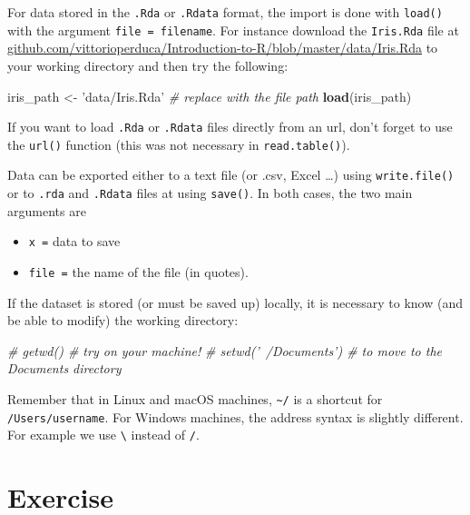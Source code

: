 \documentclass[]{book}
\newenvironment{Shaded}{\begin{snugshade}}{\end{snugshade}}
\newcommand{\CommentTok}[1]{\textcolor[rgb]{0.56,0.35,0.01}{\textit{#1}}}
\newcommand{\KeywordTok}[1]{\textcolor[rgb]{0.13,0.29,0.53}{\textbf{#1}}}
\newcommand{\NormalTok}[1]{#1}
\newcommand{\StringTok}[1]{\textcolor[rgb]{0.31,0.60,0.02}{#1}}
\providecommand{\tightlist}{%
  \setlength{\itemsep}{0pt}\setlength{\parskip}{0pt}}
\begin{document}
For data stored in the \texttt{.Rda} or \texttt{.Rdata} format, the import is done with \texttt{load()} with the argument \texttt{file\ =\ filename}. For instance download the \texttt{Iris.Rda} file at \href{https://github.com/vittorioperduca/Introduction-to-R/blob/master/data/Iris.Rda}{github.com/vittorioperduca/Introduction-to-R/blob/master/data/Iris.Rda} to your working directory and then try the following:

\begin{Shaded}
\begin{Highlighting}[]
\NormalTok{iris_path <-}\StringTok{ 'data/Iris.Rda'} \CommentTok{# replace with the file path}
\KeywordTok{load}\NormalTok{(iris_path)}
\end{Highlighting}
\end{Shaded}

If you want to load \texttt{.Rda} or \texttt{.Rdata} files directly from an url, don't forget to use the \texttt{url()} function (this was not necessary in \texttt{read.table()}).

Data can be exported either to a text file (or .csv, Excel \ldots{}) using \texttt{write.file()} or to \texttt{.rda} and \texttt{.Rdata} files at using \texttt{save()}. In both cases, the two main arguments are

\begin{itemize}
\tightlist
\item
  \texttt{x\ =} data to save
\item
  \texttt{file\ =} the name of the file (in quotes).
\end{itemize}

If the dataset is stored (or must be saved up) locally, it is necessary to know (and be able to modify) the working directory:

\begin{Shaded}
\begin{Highlighting}[]
\CommentTok{# getwd() # try on your machine!}
\CommentTok{# setwd('~/Documents') # to move to the Documents directory}
\end{Highlighting}
\end{Shaded}

Remember that in Linux and macOS machines, \texttt{\textasciitilde{}/} is a shortcut for \texttt{/Users/username}. For Windows machines, the address syntax is slightly different. For example we use \texttt{\textbackslash{}} instead of \texttt{/}.

\hypertarget{exercise}{%
\section{Exercise}\label{exercise}}
\end{document}
